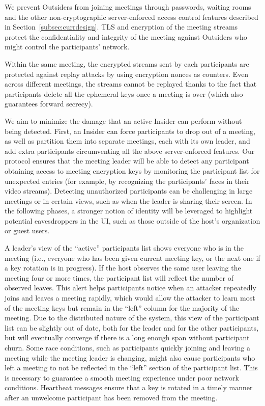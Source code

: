 We prevent Outsiders from joining meetings through passwords, waiting rooms and the other
non-cryptographic server-enforced access control features described in
Section~\ref{subsec:currdesign}. TLS and encryption of the meeting streams protect the
confidentiality and integrity of the meeting against Outsiders who might control the participants'
network.

Within the same meeting, the encrypted streams sent by each participants are protected against
replay attacks by using encryption nonces as counters. Even across different meetings, the streams
cannot be replayed thanks to the fact that participants delete all the ephemeral keys once a meeting
is over (which also guarantees forward secrecy). 

We aim to minimize the damage that an active Insider can perform without being detected. First, an
Insider can force participants to drop out of a meeting, as well as partition them into separate
meetings, each with its own leader, and add extra participants circumventing all the above
server-enforced features. Our protocol ensures that the meeting leader will be able to detect any
participant obtaining access to meeting encryption keys by monitoring the participant list for
unexpected entries (for example, by recognizing the participants' faces in their video streams).
Detecting unauthorized participants can be challenging in large meetings or in certain views, such
as when the leader is sharing their screen. In the following phases, a stronger notion of identity
will be leveraged to highlight potential eavesdroppers in the UI, such as those outside of the
host's organization or guest users.

A leader's view of the ``active'' participants list shows everyone who is in the meeting
(i.e., everyone who has been given current meeting key, or the next one if a key rotation is in
progress). If the host observes the same user leaving the meeting four or more times, the participant
list will reflect the number of observed leaves. This alert helps participants notice when an attacker repeatedly joins and leaves a meeting rapidly, which would allow the attacker to learn most of the meeting keys but remain in the ``left'' column for the majority of the meeting. Due to the distributed nature of the
system, this view of the participant list can be slightly out of date, both for the leader and for
the other participants, but will eventually converge if there is a long enough span without
participant churn. Some race conditions, such as participants quickly joining and leaving a meeting
while the meeting leader is changing, might also cause participants who left a meeting to not be
reflected in the ``left'' section of the participant list. This is necessary to guarantee a smooth
meeting experience under poor network conditions. Heartbeat messages ensure that a key is rotated in
a timely manner after an unwelcome participant has been removed from the meeting.

